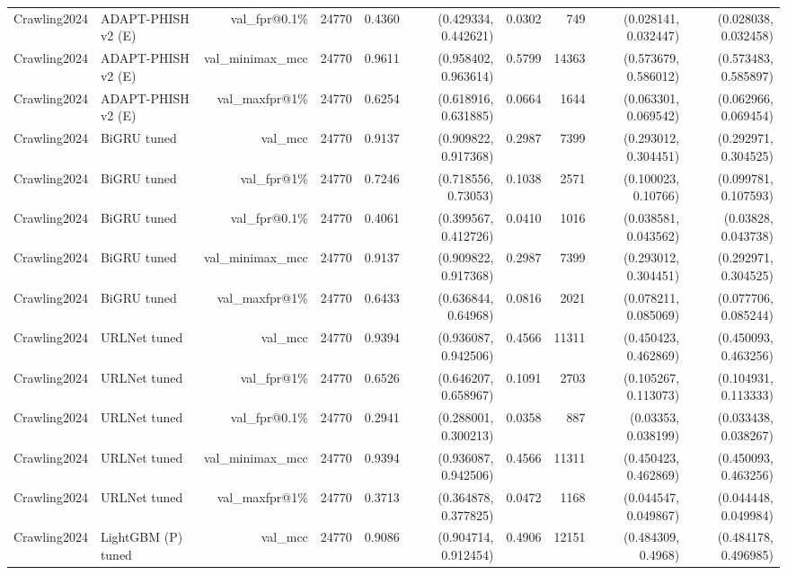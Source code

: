 \begin{table}[t]
\begin{tabular}{llrrrrrrrr}
Crawling2024 & ADAPT-PHISH v2 (E) & val\_fpr@0.1\% & 24770 & 0.4360 & (0.429334, 0.442621) & 0.0302 & 749 & (0.028141, 0.032447) & (0.028038, 0.032458) \\
Crawling2024 & ADAPT-PHISH v2 (E) & val\_minimax\_mcc & 24770 & 0.9611 & (0.958402, 0.963614) & 0.5799 & 14363 & (0.573679, 0.586012) & (0.573483, 0.585897) \\
Crawling2024 & ADAPT-PHISH v2 (E) & val\_maxfpr@1\% & 24770 & 0.6254 & (0.618916, 0.631885) & 0.0664 & 1644 & (0.063301, 0.069542) & (0.062966, 0.069454) \\
Crawling2024 & BiGRU tuned & val\_mcc & 24770 & 0.9137 & (0.909822, 0.917368) & 0.2987 & 7399 & (0.293012, 0.304451) & (0.292971, 0.304525) \\
Crawling2024 & BiGRU tuned & val\_fpr@1\% & 24770 & 0.7246 & (0.718556, 0.73053) & 0.1038 & 2571 & (0.100023, 0.10766) & (0.099781, 0.107593) \\
Crawling2024 & BiGRU tuned & val\_fpr@0.1\% & 24770 & 0.4061 & (0.399567, 0.412726) & 0.0410 & 1016 & (0.038581, 0.043562) & (0.03828, 0.043738) \\
Crawling2024 & BiGRU tuned & val\_minimax\_mcc & 24770 & 0.9137 & (0.909822, 0.917368) & 0.2987 & 7399 & (0.293012, 0.304451) & (0.292971, 0.304525) \\
Crawling2024 & BiGRU tuned & val\_maxfpr@1\% & 24770 & 0.6433 & (0.636844, 0.64968) & 0.0816 & 2021 & (0.078211, 0.085069) & (0.077706, 0.085244) \\
Crawling2024 & URLNet tuned & val\_mcc & 24770 & 0.9394 & (0.936087, 0.942506) & 0.4566 & 11311 & (0.450423, 0.462869) & (0.450093, 0.463256) \\
Crawling2024 & URLNet tuned & val\_fpr@1\% & 24770 & 0.6526 & (0.646207, 0.658967) & 0.1091 & 2703 & (0.105267, 0.113073) & (0.104931, 0.113333) \\
Crawling2024 & URLNet tuned & val\_fpr@0.1\% & 24770 & 0.2941 & (0.288001, 0.300213) & 0.0358 & 887 & (0.03353, 0.038199) & (0.033438, 0.038267) \\
Crawling2024 & URLNet tuned & val\_minimax\_mcc & 24770 & 0.9394 & (0.936087, 0.942506) & 0.4566 & 11311 & (0.450423, 0.462869) & (0.450093, 0.463256) \\
Crawling2024 & URLNet tuned & val\_maxfpr@1\% & 24770 & 0.3713 & (0.364878, 0.377825) & 0.0472 & 1168 & (0.044547, 0.049867) & (0.044448, 0.049984) \\
Crawling2024 & LightGBM (P) tuned & val\_mcc & 24770 & 0.9086 & (0.904714, 0.912454) & 0.4906 & 12151 & (0.484309, 0.4968) & (0.484178, 0.496985) \\

\end{tabular}
\end{table}

